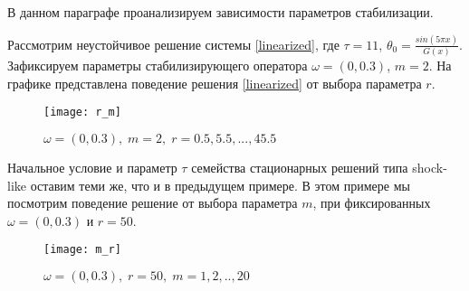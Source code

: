 В данном параграфе проанализируем зависимости параметров стабилизации.

\begin{exmp_stbur}
\end{exmp_stbur}

Рассмотрим неустойчивое решение системы \eqref{linearized}, где $\tau = 11$,
$\theta_0 = \frac{sin(5 \pi x)}{G(x)}$. Зафиксируем параметры стабилизирующего
оператора $\omega = (0, 0.3)$, $m = 2$. На графике представлена поведение решения
\eqref{linearized} от выбора параметра $r$.

\begin{figure}[H]
 \centering
  \texttt{[image: r\_m]}
  \caption{$\omega = (0, 0.3), \; m = 2, \; r = 0.5, 5.5, ..., 45.5$}
  \label{fig:fig05}
\end{figure}

\begin{exmp_stbur}
\end{exmp_stbur}

Начальное условие и параметр $\tau$ семейства стационарных решений типа
shock-like оставим теми же, что и в предыдущем примере. В этом примере мы
посмотрим поведение решение от выбора параметра $m$, при фиксированных $\omega =
(0, 0.3)$ и $r = 50$.

\begin{figure}[H]
 \centering
  \texttt{[image: m\_r]}
  \caption{$\omega = (0, 0.3), \; r = 50, \; m = 1, 2, .., 20$}
  \label{fig:fig06}
\end{figure}
